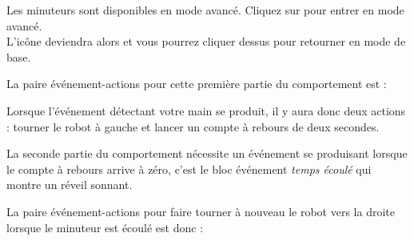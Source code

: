{Les minuteurs sont disponibles en mode avancé.
Cliquez sur  pour entrer en mode avancé.\\
L'icône deviendra alors  et vous pourrez cliquer dessus pour retourner en mode de base.}

La paire événement-actions pour cette première partie du comportement est : 

Lorsque l'événement détectant votre main se produit, il y aura donc deux actions : tourner le robot à gauche et lancer un compte à rebours de deux secondes.

La seconde partie du comportement nécessite un événement se produisant lorsque le compte à rebours arrive à zéro, c'est le bloc événement \emph{temps écoulé}  qui montre un réveil sonnant.

La paire événement-actions pour faire tourner à nouveau le robot vers la droite lorsque le minuteur est écoulé est donc : 

\bigskip


